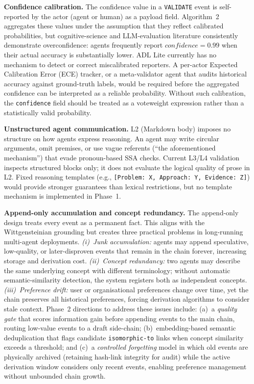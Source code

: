 \textbf{Confidence calibration.} The confidence value in a \texttt{VALIDATE} event is self-reported by the actor (agent or human) as a payload field. Algorithm~2 aggregates these values under the assumption that they reflect calibrated probabilities, but cognitive-science and LLM-evaluation literature consistently demonstrate overconfidence: agents frequently report $\mathit{confidence} = 0.99$ when their actual accuracy is substantially lower. ADL Lite currently has no mechanism to detect or correct miscalibrated reporters. A per-actor Expected Calibration Error (ECE) tracker, or a meta-validator agent that audits historical accuracy against ground-truth labels, would be required before the aggregated confidence can be interpreted as a reliable probability. Without such calibration, the \texttt{confidence} field should be treated as a voteweight expression rather than a statistically valid probability.

\textbf{Unstructured agent communication.} L2 (Markdown body) imposes no structure on how agents express reasoning. An agent may write circular arguments, omit premises, or use vague referents (``the aforementioned mechanism'') that evade pronoun-based SSA checks. Current L3/L4 validation inspects structured blocks only; it does not evaluate the logical quality of prose in L2. Fixed reasoning templates (e.g., \texttt{[Problem:\ X, Approach:\ Y, Evidence:\ Z]}) would provide stronger guarantees than lexical restrictions, but no template mechanism is implemented in Phase~1.

\textbf{Append-only accumulation and concept redundancy.} The append-only design treats every event as a permanent fact. This aligns with the Wittgensteinian grounding but creates three practical problems in long-running multi-agent deployments. \emph{(i)~Junk accumulation:} agents may append speculative, low-quality, or later-disproven events that remain in the chain forever, increasing storage and derivation cost. \emph{(ii)~Concept redundancy:} two agents may describe the same underlying concept with different terminology; without automatic semantic-similarity detection, the system registers both as independent concepts. \emph{(iii)~Preference drift:} user or organisational preferences change over time, yet the chain preserves all historical preferences, forcing derivation algorithms to consider stale context. Phase~2 directions to address these issues include: (a)~a \emph{quality gate} that scores information gain before appending events to the main chain, routing low-value events to a draft side-chain; (b)~embedding-based semantic deduplication that flags candidate \texttt{isomorphic-to} links when concept similarity exceeds a threshold; and (c)~a \emph{controlled forgetting} model in which old events are physically archived (retaining hash-link integrity for audit) while the active derivation window considers only recent events, enabling preference management without unbounded chain growth.

